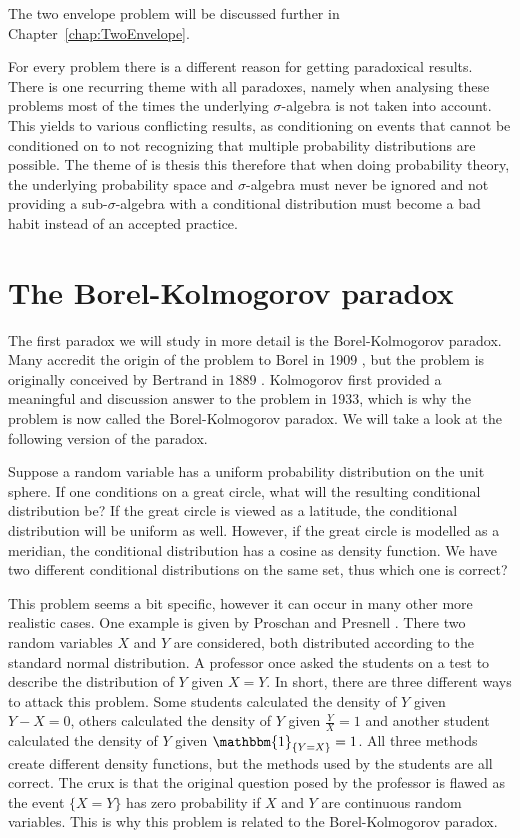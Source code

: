 \documentclass[a4paper]{report}
\theoremstyle{plain}
\theoremstyle{definition}
\theoremstyle{remark}
\numberwithin{equation}{chapter}
\DeclareMathOperator{\1}{\mathbbm{1}}
\begin{document}
The two envelope problem will be discussed further in Chapter~\ref{chap:TwoEnvelope}.

For every problem there is a different reason for getting paradoxical results. There is one recurring theme with all paradoxes, namely when analysing these problems most of the times the underlying $\sigma$-algebra is not taken into account. This yields to various conflicting results, as conditioning on events that cannot be conditioned on to not recognizing that multiple probability distributions are possible. The theme of is thesis this therefore that when doing probability theory, the underlying probability space and $\sigma$-algebra must never be ignored and not providing a sub-$\sigma$-algebra with a conditional distribution must become a bad habit instead of an accepted practice.

\chapter{The Borel-Kolmogorov paradox}\label{chap:BorelKolmogorov}
The first paradox we will study in more detail is the Borel-Kolmogorov paradox. Many accredit the origin of the problem to Borel in 1909 \cite{Borel09}, but the problem is originally conceived by Bertrand in 1889 \cite{Bertrand89}. Kolmogorov \cite{Kolmogorov33} first provided a meaningful and discussion answer to the problem in 1933, which is why the problem is now called the Borel-Kolmogorov paradox. We will take a look at the following version of the paradox.

Suppose a random variable has a uniform probability distribution on the unit sphere. If one conditions on a great circle, what will the resulting conditional distribution be? If the great circle is viewed as a latitude, the conditional distribution will be uniform as well. However, if the great circle is modelled as a meridian, the conditional distribution has a cosine as density function. We have two different conditional distributions on the same set, thus which one is correct?

This problem seems a bit specific, however it can occur in many other more realistic cases. One example is given by Proschan and Presnell \cite{Proschan98}. There two random variables $X$ and $Y$ are considered, both distributed according to the standard normal distribution. A professor once asked the students on a test to describe the distribution of $Y$ given $X=Y$. In short, there are three different ways to attack this problem. Some students calculated the density of $Y$ given $Y-X=0$, others calculated the density of $Y$ given $\frac{Y}{X}=1$ and another student calculated the density of $Y$ given $\1_{\{Y=X\}}=1$. All three methods create different density functions, but the methods used by the students are all correct. The crux is that the original question posed by the professor is flawed as the event $\{X=Y\}$ has zero probability if $X$ and $Y$ are continuous random variables. This is why this problem is related to the Borel-Kolmogorov paradox.
\end{document}
